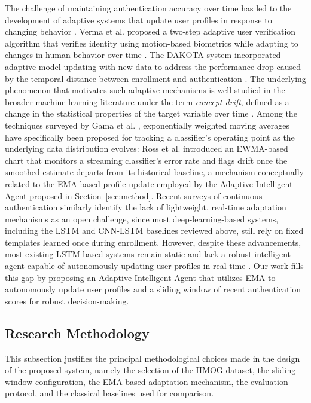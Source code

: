 \documentclass[3p,times,procedia]{elsarticle}
\begin{document}
The challenge of maintaining authentication accuracy over time
has led to the development of adaptive systems that update
user profiles in response to changing behavior \cite{verma_data-driven_2022}.
Verma et al. proposed a two-step adaptive user verification
algorithm that verifies identity using motion-based biometrics
while adapting to changes in human behavior over time
\cite{verma_data-driven_2022}. The DAKOTA system incorporated adaptive model
updating with new data to address the performance drop caused
by the temporal distance between enrollment and authentication
\cite{incel_dakota_2021}. The underlying phenomenon that
motivates such adaptive mechanisms is well studied in the
broader machine-learning literature under the term \emph{concept
drift}, defined as a change in the statistical properties of
the target variable over time \cite{gama_survey_2014}. Among
the techniques surveyed by Gama et al. \cite{gama_survey_2014},
exponentially weighted moving averages have specifically been
proposed for tracking a classifier's operating point as the
underlying data distribution evolves: Ross et al.
\cite{ross_exponentially_2012} introduced an EWMA-based chart
that monitors a streaming classifier's error rate and flags
drift once the smoothed estimate departs from its historical
baseline, a mechanism conceptually related to the EMA-based
profile update employed by the Adaptive Intelligent Agent
proposed in Section~\ref{sec:method}. Recent surveys of
continuous authentication \cite{rayani_continuous_2023,liang_behavioral_2020}
similarly identify the lack of lightweight, real-time
adaptation mechanisms as an open challenge, since most
deep-learning-based systems, including the LSTM and CNN-LSTM
baselines reviewed above, still rely on fixed templates learned
once during enrollment. However, despite these advancements, most
existing LSTM-based systems remain static and lack a robust
intelligent agent capable of autonomously updating user
profiles in real time \cite{stylios_behavioral_2021}. Our work fills this
gap by proposing an Adaptive Intelligent Agent that utilizes
EMA to autonomously update user profiles and a sliding window
of recent authentication scores for robust decision-making.

\subsection{Research Methodology}

This subsection justifies the principal methodological choices
made in the design of the proposed system, namely the
selection of the HMOG dataset, the sliding-window
configuration, the EMA-based adaptation mechanism, the
evaluation protocol, and the classical baselines used for
comparison.
\end{document}
